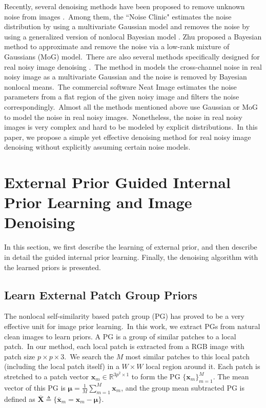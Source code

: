 \documentclass[10pt,twocolumn,letterpaper]{article}
\begin{document}
Recently, several denoising methods have been proposed to remove unknown noise from images \cite{crosschannel2016,Liu2008,almapg,Zhu_2016_CVPR,noiseclinic,ncwebsite}.\ Among them, the ``Noise Clinic" \cite{noiseclinic,ncwebsite} estimates the noise distribution by using a multivariate Gaussian model and removes the noise by using a generalized version of nonlocal Bayesian model \cite{nlbayes}. Zhu \etal proposed a Bayesian method \cite{Zhu_2016_CVPR} to approximate and remove the noise via a low-rank mixture of Gaussians (MoG) model.\ There are also several methods specifically designed for real noisy image denoising \cite{crosschannel2016,neatimage}.\ The method in \cite{crosschannel2016} models the cross-channel noise in real noisy image as a multivariate Gaussian and the noise is removed by Bayesian nonlocal means.\ The commercial software Neat Image \cite{neatimage} estimates the noise parameters from a flat region of the given noisy image and filters the noise correspondingly.\ Almost all the methods mentioned above \cite{crosschannel2016,Liu2008,almapg,Zhu_2016_CVPR,noiseclinic,ncwebsite} use Gaussian or MoG to model the noise in real noisy images.\ Nonetheless, the noise in real noisy images is very complex and hard to be modeled by explicit distributions.\ In this paper, we propose a simple yet effective denoising method for real noisy image denoising without explicitly assuming certain noise models.

\section{External Prior Guided Internal Prior Learning and Image Denoising}

In this section, we first describe the learning of external prior, and then describe in detail the guided internal prior learning. Finally, the denoising algorithm with the learned priors is presented.

\subsection{Learn External Patch Group Priors}

The nonlocal self-similarity based patch group (PG) \cite{pgpd} has proved to be a very effective unit for image prior learning.\ In this work, we extract PGs from natural clean images to learn priors. A PG is a group of similar patches to a local patch.\ In our method, each local patch is extracted from a RGB image with patch size $p\times p \times 3$.\ We search the $M$ most similar patches to this local patch (including the local patch itself) in a $W\times W$ local region around it. Each patch is stretched to a patch vector $\mathbf{x}_{m}\in \mathbb{R}^{3p^{2}\times1}$ to form the PG $\{\mathbf{x}_{m}\}_{m=1}^{M}$. The mean vector of this PG is $\bm{\mu}=\frac{1}{M}\sum_{m=1}^{M}\mathbf{x}_{m}$, and the group mean subtracted PG is defined as $\mathbf{\overline{X}}\triangleq \{\mathbf{\overline{x}}_{m}=\mathbf{x}_{m}-\bm{\mu}\}$.
\end{document}
